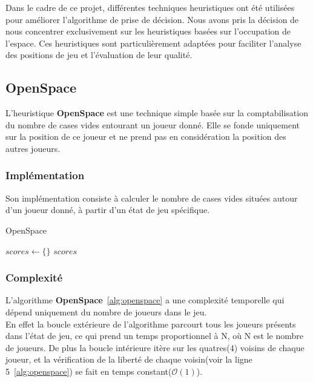 Dans le cadre de ce projet, différentes techniques heuristiques ont été utilisées pour améliorer l'algorithme de prise de décision. 
Nous avons pris la décision de nous concentrer exclusivement sur les heuristiques basées sur l'occupation de l'espace. Ces heuristiques sont particulièrement 
adaptées pour faciliter l'analyse des positions de jeu et l'évaluation de leur qualité. 

\subsection{OpenSpace}
L'heuristique \textbf{OpenSpace} est une technique simple basée sur la comptabilisation du nombre de cases vides entourant 
un joueur donné. Elle se fonde uniquement sur la position de ce joueur et ne prend pas en considération la position des 
autres joueurs.

\tocless\subsubsection{Implémentation}
Son implémentation consiste à calculer le nombre de cases vides situées autour d'un joueur donné, à partir d'un état de jeu spécifique.\\

\begin{algorithm}[H]
	\caption{OpenSpace}
	\label{alg:openspace}
	\DontPrintSemicolon
	$scores \gets \{\}$\;
	\Return $scores$\;
\end{algorithm}

\tocless\subsubsection{Complexité}
L'algorithme \textbf{OpenSpace}~\ref{alg:openspace} a une complexité temporelle qui dépend uniquement du nombre de joueurs dans le jeu.\\

En effet la boucle extérieure de l'algorithme parcourt tous les joueurs présents dans l'état de jeu, ce qui prend un temps 
proportionnel à N, où N est le nombre de joueurs. De plus la boucle intérieure itère sur les quatres(4) voisins de chaque joueur, et 
la vérification de la liberté de chaque voisin(voir la ligne 5~\ref{alg:openspace}) se fait en temps constant($\mathcal{O}(1)$).\\

